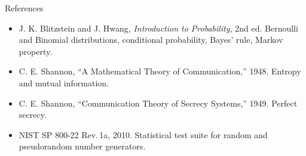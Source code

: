 \documentclass[11pt,aspectratio=169]{beamer}
\begin{document}
\begin{frame}{References}
  \begin{itemize}
    \item J. K. Blitzstein and J. Hwang, \emph{Introduction to Probability},
          2nd ed. Bernoulli and Binomial distributions, conditional
          probability, Bayes' rule, Markov property.
    \item C. E. Shannon, ``A Mathematical Theory of Communication,'' 1948.
          Entropy and mutual information.
    \item C. E. Shannon, ``Communication Theory of Secrecy Systems,'' 1949.
          Perfect secrecy.
    \item NIST SP 800-22 Rev.\,1a, 2010. Statistical test suite for random
          and pseudorandom number generators.
  \end{itemize}
\end{frame}
\end{document}

